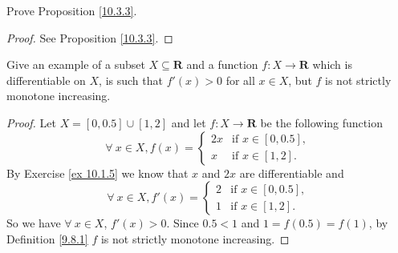 \begin{exercise}\label{ex 10.3.4}
    Prove Proposition \ref{10.3.3}.
\end{exercise}

\begin{proof}
    See Proposition \ref{10.3.3}.
\end{proof}

\begin{exercise}\label{ex 10.3.5}
    Give an example of a subset \(X \subseteq \mathbf{R}\) and a function \(f : X \to \mathbf{R}\) which is differentiable on \(X\), is such that \(f'(x) > 0\) for all \(x \in X\), but \(f\) is not strictly monotone increasing.
\end{exercise}

\begin{proof}
    Let \(X = [0, 0.5] \cup [1, 2]\) and let \(f : X \to \mathbf{R}\) be the following function
    \[
        \forall\ x \in X, f(x) = \begin{cases}
            2x & \text{if } x \in [0, 0.5], \\
            x  & \text{if } x \in [1, 2].
        \end{cases}
    \]
    By Exercise \ref{ex 10.1.5} we know that \(x\) and \(2x\) are differentiable and
    \[
        \forall\ x \in X, f'(x) = \begin{cases}
            2 & \text{if } x \in [0, 0.5], \\
            1 & \text{if } x \in [1, 2].
        \end{cases}
    \]
    So we have \(\forall\ x \in X\), \(f'(x) > 0\).
    Since \(0.5 < 1\) and \(1 = f(0.5) = f(1)\), by Definition \ref{9.8.1} \(f\) is not strictly monotone increasing.
\end{proof}